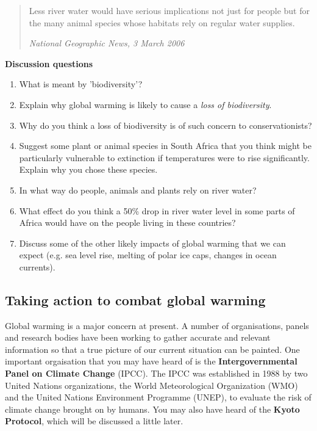 {\begin{quote}
Less river water would have serious implications not just for people but for the many animal species whose habitats rely on regular water supplies. 

\textit{National Geographic News, 3 March 2006}
\end{quote}

\textbf{Discussion questions}

\begin{enumerate}
\item{What is meant by 'biodiversity'?}
\item{Explain why global warming is likely to cause a \textit{loss of biodiversity}.}
\item{Why do you think a loss of biodiversity is of such concern to conservationists?} 
\item{Suggest some plant or animal species in South Africa that you think might be particularly vulnerable to extinction if temperatures were to rise significantly. Explain why you chose these species.}
\item{In what way do people, animals and plants rely on river water?}
\item{What effect do you think a 50\% drop in river water level in some parts of Africa would have on the people living in these countries?} 
\item{Discuss some of the other likely impacts of global warming that we can expect (e.g. sea level rise, melting of polar ice caps, changes in ocean currents).} 
\end{enumerate}
}

\subsection{Taking action to combat global warming}

Global warming is a major concern at present. A number of organisations, panels and research bodies have been working to gather accurate and relevant information so that a true picture of our current situation can be painted. One important orgaisation that you may have heard of is the \textbf{Intergovernmental Panel on Climate Change} (IPCC). The IPCC was established in 1988 by two United Nations organizations, the World Meteorological Organization (WMO) and the United Nations Environment Programme (UNEP), to evaluate the risk of climate change brought on by humans. You may also have heard of the \textbf{Kyoto Protocol}, which will be discussed a little later.\\

